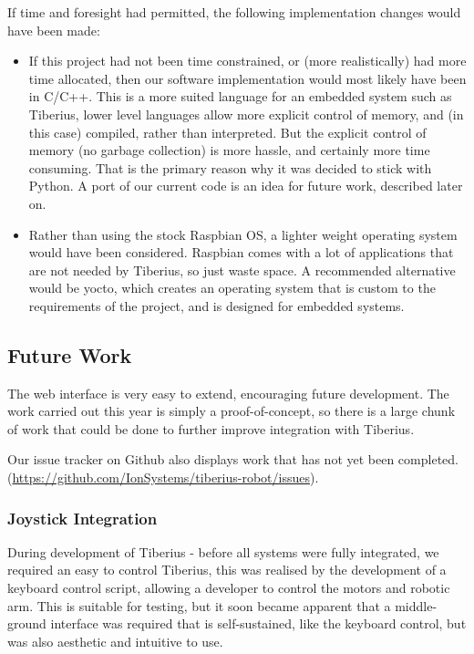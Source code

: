 If time and foresight had permitted, the following implementation changes would have been made:
\begin{itemize}
\item If this project had not been time constrained, or (more realistically) had more time allocated, then our software implementation would most likely have been in C/C++. This is a more suited language for an embedded system such as Tiberius, lower level languages allow more explicit control of memory, and (in this case) compiled, rather than interpreted. But the explicit control of memory (no garbage collection) is more hassle, and certainly more time consuming. That is the primary reason why it was decided to stick with Python. A port of our current code is an idea for future work, described later on.

\item Rather than using the stock Raspbian OS, a lighter weight operating system would have been considered. Raspbian comes with a lot of applications that are not needed by Tiberius, so just waste space. A recommended alternative would be \gls{yocto}, which creates an  operating system that is custom to the requirements of the project, and is designed for embedded systems.

\end{itemize}

\subsection{Future Work}
\label{sec:web_future_work}

The web interface is very easy to extend, encouraging future development.
The work carried out this year is simply a proof-of-concept, so there is a large chunk of work that could be done to further improve integration with Tiberius.

Our issue tracker on Github also displays work that has not yet been completed. (\url{https://github.com/IonSystems/tiberius-robot/issues}).

\subsubsection{Joystick Integration}
During development of Tiberius - before all systems were fully integrated, we required an easy
to control Tiberius, this was realised by the development of a keyboard control script, allowing a developer to control the motors and robotic arm. This is suitable for testing, but it soon became apparent that a middle-ground interface was required that is self-sustained, like the keyboard control, but was also aesthetic and intuitive to use.

